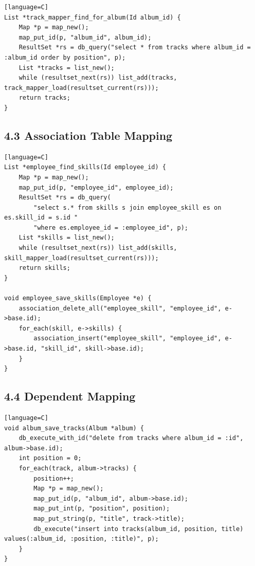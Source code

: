 \documentclass[11pt]{article}
\begin{document}
\begin{verbatim}[language=C]
List *track_mapper_find_for_album(Id album_id) {
    Map *p = map_new();
    map_put_id(p, "album_id", album_id);
    ResultSet *rs = db_query("select * from tracks where album_id = :album_id order by position", p);
    List *tracks = list_new();
    while (resultset_next(rs)) list_add(tracks, track_mapper_load(resultset_current(rs)));
    return tracks;
}
\end{verbatim}

\subsection{4.3 Association Table
Mapping}\label{association-table-mapping}

\begin{verbatim}[language=C]
List *employee_find_skills(Id employee_id) {
    Map *p = map_new();
    map_put_id(p, "employee_id", employee_id);
    ResultSet *rs = db_query(
        "select s.* from skills s join employee_skill es on es.skill_id = s.id "
        "where es.employee_id = :employee_id", p);
    List *skills = list_new();
    while (resultset_next(rs)) list_add(skills, skill_mapper_load(resultset_current(rs)));
    return skills;
}

void employee_save_skills(Employee *e) {
    association_delete_all("employee_skill", "employee_id", e->base.id);
    for_each(skill, e->skills) {
        association_insert("employee_skill", "employee_id", e->base.id, "skill_id", skill->base.id);
    }
}
\end{verbatim}

\subsection{4.4 Dependent Mapping}\label{dependent-mapping}

\begin{verbatim}[language=C]
void album_save_tracks(Album *album) {
    db_execute_with_id("delete from tracks where album_id = :id", album->base.id);
    int position = 0;
    for_each(track, album->tracks) {
        position++;
        Map *p = map_new();
        map_put_id(p, "album_id", album->base.id);
        map_put_int(p, "position", position);
        map_put_string(p, "title", track->title);
        db_execute("insert into tracks(album_id, position, title) values(:album_id, :position, :title)", p);
    }
}
\end{verbatim}
\end{document}
